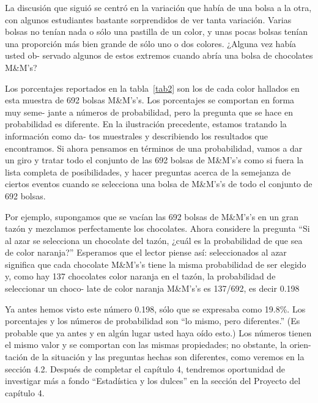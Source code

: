 \documentclass[10pt,twoside]{article}
\begin{document}
La discusión que siguió se centró en la variación que había de una bolsa a la
otra, con algunos estudiantes bastante sorprendidos de ver tanta variación. Varias
bolsas no tenían nada o sólo una pastilla de un color, y unas pocas bolsas tenían una
proporción más bien grande de sólo uno o dos colores. ¿Alguna vez había usted ob-
servado algunos de estos extremos cuando abría una bolsa de chocolates M\&M's?

Los porcentajes reportados en la tabla~\ref{tab2} son los de cada color hallados en esta
muestra de 692 bolsas M\&M's’s. Los porcentajes se comportan en forma muy seme-
jante a números de probabilidad, pero la pregunta que se hace en probabilidad es
diferente. En la ilustración precedente, estamos tratando la información como da-
tos muestrales y describiendo los resultados que encontramos. Si ahora pensamos
en términos de una probabilidad, vamos a dar un giro y tratar todo el conjunto de
las 692 bolsas de M\&M's’s como si fuera la lista completa de posibilidades, y hacer
preguntas acerca de la semejanza de ciertos eventos cuando se selecciona una bolsa
de M\&M's’s de todo el conjunto de 692 bolsas.

Por ejemplo, supongamos que se vacían las 692 bolsas de M\&M's’s en un gran
tazón y mezclamos perfectamente los chocolates. Ahora considere la pregunta “Si
al azar se selecciona un chocolate del tazón, ¿cuál es la probabilidad de que sea de
color naranja?” Esperamos que el lector piense así: seleccionados al azar significa
que cada chocolate M\&M's’s tiene la misma probabilidad de ser elegido y, como hay
137 chocolates color naranja en el tazón, la probabilidad de seleccionar un choco-
late de color naranja M\&M's’s es 137/692, es decir 0.198

Ya antes hemos visto este número 0.198, sólo que se expresaba como 19.8\%.
Los porcentajes y los números de probabilidad son “lo mismo, pero diferentes.” (Es
probable que ya antes y en algún lugar usted haya oído esto.) Los números tienen
el mismo valor y se comportan con las mismas propiedades; no obstante, la orien-
tación de la situación y las preguntas hechas son diferentes, como veremos en la
sección 4.2.
Después de completar el capítulo 4, tendremos oportunidad de investigar más a
fondo “Estadística y los dulces” en la sección del Proyecto del capítulo 4.
\end{document}
